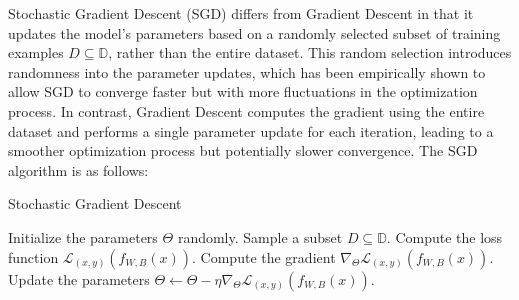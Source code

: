 Stochastic Gradient Descent (SGD) differs from Gradient Descent in that it updates the model's 
parameters based on a randomly selected subset of training examples $D\subseteq \mathbb{D}$, rather than 
the entire dataset. 
This random selection introduces randomness into the parameter updates, which has been empirically shown
to allow SGD to converge faster 
but with more fluctuations in the optimization process. 
In contrast, Gradient Descent computes the gradient 
using the entire dataset and performs a single parameter update for each iteration, leading to a smoother 
optimization process but potentially slower convergence.
The SGD algorithm is as follows:

\begin{algorithm}[H]
    \caption{Stochastic Gradient Descent}
    \begin{algorithmic}[1]
        \State Initialize the parameters $\Theta$ randomly.
            \State Sample a subset $D\subseteq\mathbb{D}$.
                \State Compute the loss function $\mathcal{L}_{(x,y)}(f_{W,B}(x))$.
                \State Compute the gradient $\nabla_{\Theta}\mathcal{L}_{(x,y)}(f_{W,B}(x))$.
                \State Update the parameters $\Theta\gets\Theta-\eta\nabla_{\Theta}\mathcal{L}_{(x,y)}(f_{W,B}(x))$.
            \EndFor
        \EndWhile
    \end{algorithmic}
\end{algorithm}
